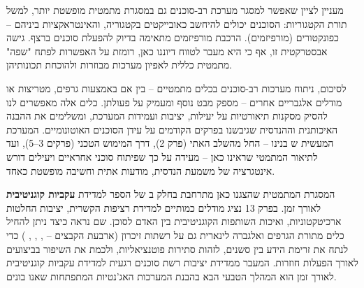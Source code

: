 מעניין לציין שאפשר למסגר מערכת רב-סוכנים גם במסגרת מתמטית מופשטת יותר, למשל תורת הקטגוריות: הסוכנים יכולים להיחשב כאובייקטים בקטגוריה, והאינטראקציות ביניהם – כפונקטורים (מורפיזמים). הרכבת מורפיזמים מתאימה בדיוק להפעלת סוכנים ברצף. גישה אבסטרקטית זו, אף כי היא מעבר לטווח דיוננו כאן, רומזת על האפשרות לפתח "שפה" מתמטית כללית לאפיון מערכות  מבוזרות ולהוכחת תכונותיהן.

לסיכום, ניתוח מערכות רב-סוכנים בכלים מתמטיים – בין אם באמצעות גרפים, מטריצות או מודלים אלגבריים אחרים – מספק מבט נוסף ומעמיק על פעולתן. כלים אלה מאפשרים לנו להסיק מסקנות תיאורטיות על יעילות, יציבות ועמידות המערכת, ומשלימים את ההבנה האיכותנית וההנדסית שגיבשנו בפרקים הקודמים על עידן הסוכנים האוטונומיים. המערכת המעשית ש בנינו – החל מהשלב האתי (פרק \num{2}), דרך המימוש הטכני (פרקים \num{3}–\num{5}), ועד לתיאור המתמטי שראינו כאן – מעידה על כך שפיתוח סוכני  אחראיים ויעילים דורש אינטגרציה של משמעת הנדסית, מודעות אתית וחשיבה מופשטת כאחד.

המסגרת המתמטית שהצגנו כאן מתרחבת בחלק ב של הספר למדידת \textbf{עקביות קוגניטיבית} לאורך זמן. בפרק \num{13} נציג מודלים כמותיים למדידת רציפות הקשרית, יציבות החלטות ארכיטקטוניות, ואיכות השותפות הקוגניטיבית בין האדם לסוכן. שם נראה כיצד ניתן להחיל כלים מתורת הגרפים ואלגברה לינארית גם על רשתות זיכרון (ארבעת הקבצים – , , , ) כדי לנתח את זרימת הידע בין סשנים, לזהות סתירות פוטנציאליות, ולכמת את השיפור בביצועים לאורך הפעלות חוזרות. המעבר ממדידת יציבות רשת סוכנים רגעית למדידת עקביות קוגניטיבית לאורך זמן הוא המהלך הטבעי הבא בהבנת המערכות האג'נטיות המתפתחות שאנו בונים.
